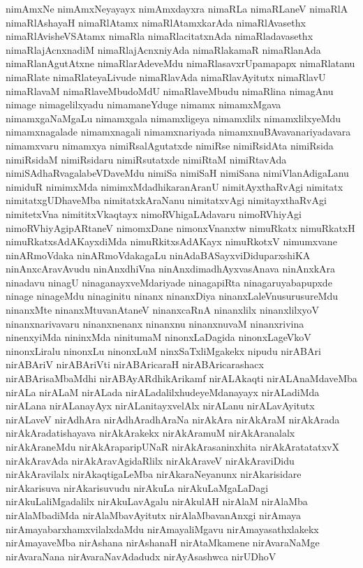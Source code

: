 {nimAmxNe
nimAmxNeyayayx
nimAmxdayxra
nimaRLa
nimaRLaneV
nimaRlA
nimaRlAshayaH
nimaRlAtamx
nimaRlAtamxkarAda
nimaRlAvasethx
nimaRlAvisheVSAtamx
nimaRla
nimaRlacitatxnAda
nimaRladavasethx
nimaRlajAcnxnadiM
nimaRlajAcnxniyAda
nimaRlakamaR
nimaRlanAda
nimaRlanAgutAtxne
nimaRlarAdeveMdu
nimaRlasavxrUpamapapx
nimaRlatanu
nimaRlate
nimaRlateyaLivude
nimaRlavAda
nimaRlavAyitutx
nimaRlavU
nimaRlavaM
nimaRlaveMbudoMdU
nimaRlaveMbudu
nimaRlina
nimagAnu
nimage
nimagelilxyadu
nimamaneYduge
nimamx
nimamxMgava
nimamxgaNaMgaLu
nimamxgala
nimamxligeya
nimamxlilx
nimamxlilxyeMdu
nimamxnagalade
nimamxnagali
nimamxnariyada
nimamxnuBAvavanariyadavara
nimamxvaru
nimamxya
nimiRsalAgutatxde
nimiRse
nimiRsidAta
nimiRsida
nimiRsidaM
nimiRsidaru
nimiRsutatxde
nimiRtaM
nimiRtavAda
nimiSAdhaRvagalabeVDaveMdu
nimiSa
nimiSaH
nimiSana
nimiVlanAdigaLanu
nimiduR
nimimxMda
nimimxMdadhikaranAranU
nimitAyxthaRvAgi
nimitatx
nimitatxgUDhaveMba
nimitatxkAraNanu
nimitatxvAgi
nimitayxthaRvAgi
nimitetxVna
nimititxVkaqtayx
nimoRVhigaLAdavaru
nimoRVhiyAgi
nimoRVhiyAgipARtaneV
nimomxDane
nimonxVnanxtw
nimuRkatx
nimuRkatxH
nimuRkatxsAdAKayxdiMda
nimuRkitxsAdAKayx
nimuRkotxV
nimumxvane
ninARmoVdaka
ninARmoVdakagaLu
ninAdaBASayxviDiduparxshiKA
ninAnxcAravAvudu
ninAnxdhiVna
ninAnxdimadhAyxvasAnava
ninAnxkAra
ninadavu
ninagU
ninaganayxveMdariyade
ninagapiRta
ninagaruyabapupxde
ninage
ninageMdu
ninaginitu
ninanx
ninanxDiya
ninanxLaleVnusurusureMdu
ninanxMte
ninanxMtuvanAtaneV
ninanxcaRnA
ninanxlilx
ninanxlilxyoV
ninanxnarivavaru
ninanxnenanx
ninanxnu
ninanxnuvaM
ninanxrivina
ninenxyiMda
nininxMda
ninitumaM
ninonxLaDagida
ninonxLageVkoV
ninonxLiralu
ninonxLu
ninonxLuM
ninxSaTxliMgakekx
nipudu
nirABAri
nirABAriV
nirABAriVti
nirABAricaraH
nirABAricarashacx
nirABArisaMbaMdhi
nirABAyARdhikArikamf
nirALAkaqti
nirALAnaMdaveMba
nirALa
nirALaM
nirALada
nirALadalilxhudeyeMdanayayx
nirALadiMda
nirALana
nirALanayAyx
nirALanitayxvelAlx
nirALanu
nirALavAyitutx
nirALaveV
nirAdhAra
nirAdhAradhAraNa
nirAkAra
nirAkAraM
nirAkArada
nirAkAradatishayava
nirAkArakekx
nirAkAramuM
nirAkAranalalx
nirAkAraneMdu
nirAkAraparipUNaR
nirAkArasaninxhita
nirAkAratatatxvX
nirAkAravAda
nirAkAravAgidaRlilx
nirAkAraveV
nirAkAraviDidu
nirAkAravilalx
nirAkaqtigaLeMba
nirAkaraNeyanunx
nirAkarisidare
nirAkarisuva
nirAkarisuvudu
nirAkuLa
nirAkuLaMgaLaDagi
nirAkuLaliMgadalilx
nirAkuLavAgalu
nirAkulAH
nirAlaM
nirAlaMba
nirAlaMbadiMda
nirAlaMbavAyitutx
nirAlaMbavanAnxgi
nirAmaya
nirAmayabarxhamxvilalxdaMdu
nirAmayaliMgavu
nirAmayasathxlakekx
nirAmayaveMba
nirAshana
nirAshanaH
nirAtaMkamene
nirAvaraNaMge
nirAvaraNana
nirAvaraNavAdadudx
nirAyAsashwca
nirUDhoV
}
